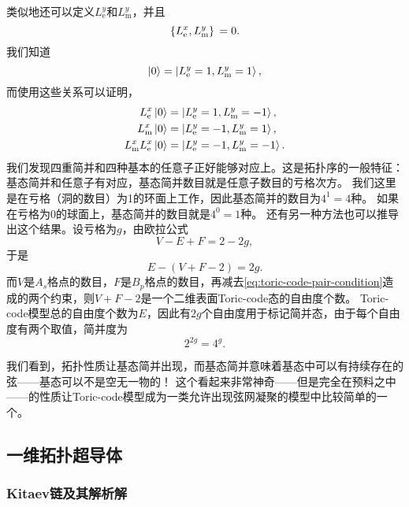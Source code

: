 \documentclass[hyperref, UTF8, a4paper]{ctexart}
\begin{document}
类似地还可以定义${L}^y_\text{e}$和${L}^y_\text{m}$，并且
\begin{equation}
    \acomm*{{L}^x_\text{e}}{{L}^y_\text{m}} = 0.
\end{equation}
我们知道
\begin{equation}
    \ket{0} = \ket{L_\text{e}^y=1, L_\text{m}^y=1},
\end{equation}
而使用这些关系可以证明，
\begin{equation}
    \begin{aligned}
        {L}^x_\text{e} \ket{0} &= \ket{L_\text{e}^y=1, L_\text{m}^y=-1}, \\
        {L}^x_\text{m} \ket{0} &= \ket{L_\text{e}^y=-1, L_\text{m}^y=1}, \\
        {L}^x_\text{m} {L}^x_\text{e} \ket{0} &= \ket{L_\text{e}^y=-1, L_\text{m}^y=-1}.
    \end{aligned}
\end{equation}
我们发现四重简并和四种基本的任意子正好能够对应上。这是拓扑序的一般特征：基态简并和任意子有对应，基态简并数目就是任意子数目的亏格次方。
我们这里是在亏格（洞的数目）为1的环面上工作，因此基态简并的数目为$4^1=4$种。
如果在亏格为0的球面上，基态简并的数目就是$4^0=1$种。
还有另一种方法也可以推导出这个结果。设亏格为$g$，由欧拉公式
\[
    V - E + F = 2 - 2g,
\]
于是
\[
    E - (V + F - 2) = 2g.
\]
而$V$是$A_s$格点的数目，$F$是$B_p$格点的数目，再减去\eqref{eq:toric-code-pair-condition}造成的两个约束，则$V+F-2$是一个二维表面Toric-code态的自由度个数。
Toric-code模型总的自由度个数为$E$，因此有$2g$个自由度用于标记简并态，由于每个自由度有两个取值，简并度为
\[
    2^{2g} = 4^g.
\]

我们看到，拓扑性质让基态简并出现，而基态简并意味着基态中可以有持续存在的弦——基态可以不是空无一物的！
这个看起来非常神奇——但是完全在预料之中——的性质让Toric-code模型成为一类允许出现弦网凝聚的模型中比较简单的一个。

\subsection{一维拓扑超导体}

\subsubsection{Kitaev链及其解析解}
\end{document}
